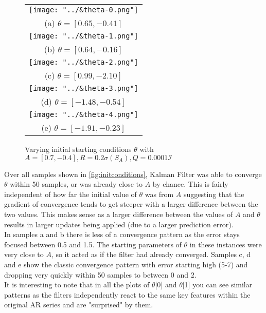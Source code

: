 \documentclass[sigconf]{acmart}
\begin{document}
\begin{figure}[h]
  \centering
    \begin{tabular}{c}
    \texttt{[image: "../\&theta-0.png"]} \\
    (a) $\theta = [0.65, -0.41]$ \\[6pt]
    \texttt{[image: "../\&theta-1.png"]} \\
    (b) $\theta = [0.64, -0.16]$ \\[6pt]
     \texttt{[image: "../\&theta-2.png"]} \\ 
    (c) $\theta = [ 0.99, -2.10]$ \\[6pt]
    \texttt{[image: "../\&theta-3.png"]} \\
    (d) $\theta = [-1.48, -0.54]$ \\[6pt]
    \texttt{[image: "../\&theta-4.png"]} \\
    (e) $\theta = [-1.91, -0.23]$ \\[6pt]
    \end{tabular}
    \caption{Varying initial starting conditions $\theta $ with $A = [0.7, -0.4], R = 0.2\sigma(S_{A}), Q = 0.0001\mathcal{I}  $}
    \label{fig:initconditions}
  \end{figure}

Over all samples shown in \autoref{fig:initconditions}, Kalman Filter was able to converge $\theta$ within 50 samples, or was already close to $A$ by chance. This is fairly independent of how far the initial value of $\theta$ was from $A$ suggesting that the gradient of convergence tends to get steeper with a larger difference between the two values. This makes sense as a larger difference between the values of $A$ and $\theta$ results in larger updates being applied (due to a larger prediction error).\\ 

In samples a and b there is less of a convergence pattern as the error stays focused between 0.5 and 1.5. The starting parameters of $\theta$ in these instances were very close to $A$, so it acted as if the filter had already converged. Samples c, d and e show the classic convergence pattern with error starting high (5-7) and dropping very quickly within 50 samples to between 0 and 2. \\

It is interesting to note that in all the plots of $\theta$[0] and $\theta$[1] you can see similar patterns as the filters independently react to the same key features within the original AR series and are "surprised" by them.\\
\end{document}
